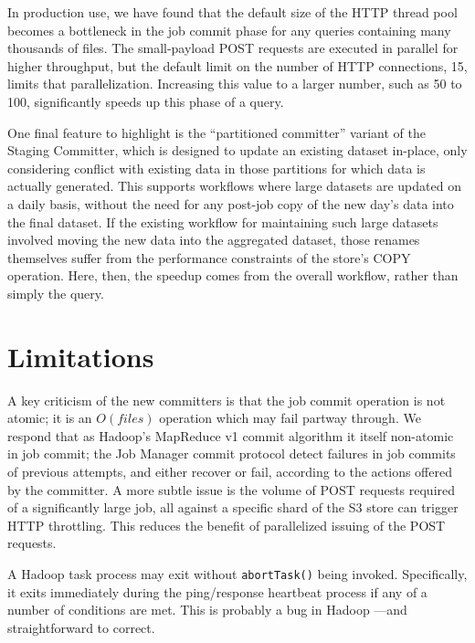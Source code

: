 \documentclass[format=acmsmall, screen=true, review=false]{acmart}
\begin{document}
In production use, we have found that the default size of the HTTP thread
pool becomes a bottleneck in the job commit phase for any queries
containing many thousands of files.
The small-payload POST requests are executed in parallel for higher
throughput, but the default limit on the number of HTTP connections, 15, 
limits that parallelization.
Increasing this value to a larger number, such as 50 to 100, significantly
speeds up this phase of a query.

One final feature to highlight is the ``partitioned committer'' variant
of the Staging Committer, which is designed to update an existing
dataset in-place, only considering conflict with existing data in
those partitions for which data is actually generated.
This supports workflows where large datasets are updated on a daily basis,
without the need for any post-job copy of the new day's data into the
final dataset.
If the existing workflow for maintaining such large datasets involved
moving the new data into the aggregated dataset, those renames themselves
suffer from the performance constraints of the store's COPY operation.
Here, then, the speedup comes from the overall workflow, rather than
simply the query.



\section{Limitations}
\label{sec:limitations}

A key criticism of the new committers is that the job commit operation is not atomic;
it is an $O(files)$ operation which may fail partway through.
We respond that as Hadoop's MapReduce v1 commit algorithm it itself non-atomic in job commit;
the Job Manager commit protocol detect failures in job commits
of previous attempts, and either recover or fail, according to the actions
offered by the committer.
A more subtle issue is the volume of POST requests required of a significantly large job,
all against a specific shard of the S3 store can trigger HTTP throttling.
This reduces the benefit of parallelized issuing of the POST requests.

A Hadoop task process may exit without \texttt{abortTask()} being invoked.
Specifically, it exits immediately during the ping/response
heartbeat process if any of a number of conditions are met.
This is probably a bug in Hadoop ---and straightforward to correct.
\end{document}
